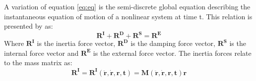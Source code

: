 \noindent A variation of equation \ref{eq:eq} is the semi-discrete global equation describing the instantaneous equation of motion of a nonlinear system at time t. This relation is presented by \cite{Mathisen1990} as:
\begin{equation}
    \boldsymbol{R^I}+ \boldsymbol{R^D} + \boldsymbol{R^S}=\boldsymbol{R^E}
\end{equation}
Where $\boldsymbol{R^I}$ is the inertia force vector, $\boldsymbol{R^D}$ is the damping force vector, $\boldsymbol{R^S}$ is the internal force vector and $\boldsymbol{R^E}$ is the external force vector. \newline
\newline
The inertia forces relate to the mass matrix as:
\begin{equation}
    \boldsymbol{R^I}= \boldsymbol{R^I(\ddot{r},\dot{r},r,t)}=\boldsymbol{M(\ddot{r},\dot{r},r,t)}\boldsymbol{r}
\end{equation}

